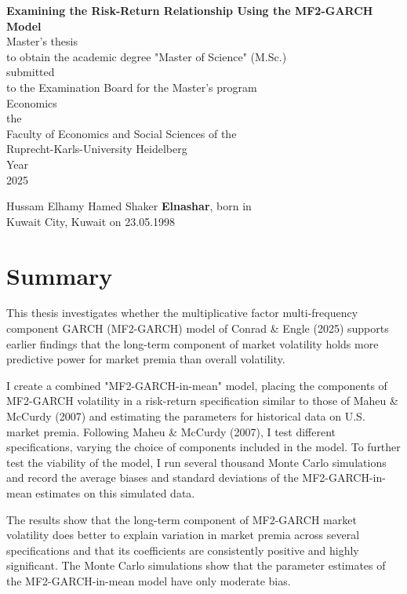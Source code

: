\documentclass[12pt]{article}
\begin{document}
\thispagestyle{empty}
\hspace{0pt}
\begin{center}
\vfill
\textbf{Examining the Risk-Return Relationship Using the MF2-GARCH Model}\\
\vspace{25mm}
Master's thesis\\
to obtain the academic degree "Master of Science" (M.Sc.)\\
\vspace{10mm}
submitted\\
to the Examination Board for the Master's program\\
\vspace{10mm}
Economics\\
\vspace{10mm}
the\\
Faculty of Economics and Social Sciences of the\\
Ruprecht-Karls-University Heidelberg\\
\vspace{10mm}
Year\\
2025
\vspace{10mm}
\end{center}
\vfill
Hussam Elhamy Hamed Shaker \textbf{Elnashar}, born in\\
Kuwait City, Kuwait on 23.05.1998
\hspace{0pt}


\newpage
\thispagestyle{empty}
\restoregeometry
\section*{Summary}
This thesis investigates whether the multiplicative factor multi-frequency component GARCH (MF2-GARCH) model of Conrad \& Engle (2025) supports earlier findings that the long-term component of market volatility holds more predictive power for market premia than overall volatility.\par
I create a combined "MF2-GARCH-in-mean" model, placing the components of MF2-GARCH volatility in a risk-return specification similar to those of Maheu \& McCurdy (2007) and estimating the parameters for historical data on U.S. market premia. Following Maheu \& McCurdy (2007), I test different specifications, varying the choice of components included in the model. To further test the viability of the model, I run several thousand Monte Carlo simulations and record the average biases and standard deviations of the MF2-GARCH-in-mean estimates on this simulated data.\par
The results show that the long-term component of MF2-GARCH market volatility does better to explain variation in market premia across several specifications and that its coefficients are consistently positive and highly significant. The Monte Carlo simulations show that the parameter estimates of the MF2-GARCH-in-mean model have only moderate bias.\par
\end{document}
